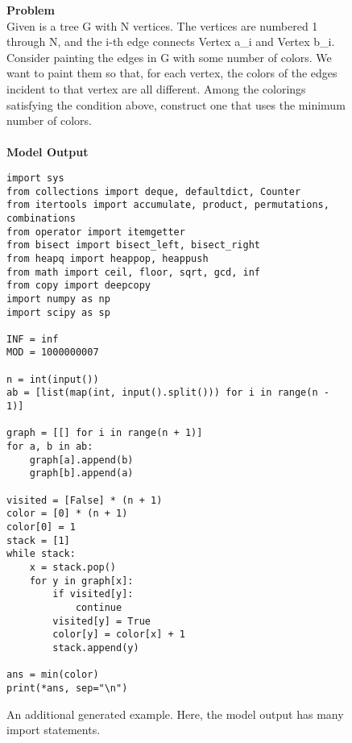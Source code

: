 \documentclass{article}
\begin{document}
\begin{figure*}
    \textbf{Problem} \\
    Given is a tree G with N vertices. The vertices are numbered 1 through N, and the i-th edge connects Vertex a\_i and Vertex b\_i. Consider painting the edges in G with some number of colors. We want to paint them so that, for each vertex, the colors of the edges incident to that vertex are all different. Among the colorings satisfying the condition above, construct one that uses the minimum number of colors.
 \\ 
 \\
 \textbf{Model Output}
 \begin{small}
 \begin{verbatim}
import sys
from collections import deque, defaultdict, Counter
from itertools import accumulate, product, permutations, combinations
from operator import itemgetter
from bisect import bisect_left, bisect_right
from heapq import heappop, heappush
from math import ceil, floor, sqrt, gcd, inf
from copy import deepcopy
import numpy as np
import scipy as sp

INF = inf
MOD = 1000000007

n = int(input())
ab = [list(map(int, input().split())) for i in range(n - 1)]

graph = [[] for i in range(n + 1)]
for a, b in ab:
    graph[a].append(b)
    graph[b].append(a)

visited = [False] * (n + 1)
color = [0] * (n + 1)
color[0] = 1
stack = [1]
while stack:
    x = stack.pop()
    for y in graph[x]:
        if visited[y]:
            continue
        visited[y] = True
        color[y] = color[x] + 1
        stack.append(y)

ans = min(color)
print(*ans, sep="\n")
\end{verbatim}
\end{small}
    \caption{An additional generated example. Here, the model output has many import statements.}
    \label{fig:supp_sample_2}
\end{figure*}
\end{document}
